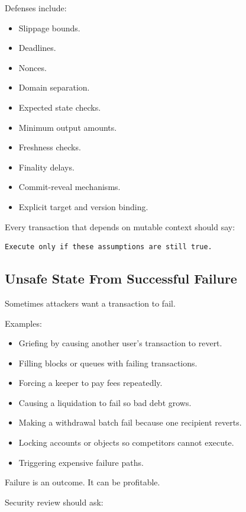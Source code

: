Defenses include:

\begin{itemize}
\tightlist
\item
  Slippage bounds.
\item
  Deadlines.
\item
  Nonces.
\item
  Domain separation.
\item
  Expected state checks.
\item
  Minimum output amounts.
\item
  Freshness checks.
\item
  Finality delays.
\item
  Commit-reveal mechanisms.
\item
  Explicit target and version binding.
\end{itemize}

Every transaction that depends on mutable context should say:

\begin{lstlisting}
Execute only if these assumptions are still true.
\end{lstlisting}

\subsection{Unsafe State From Successful Failure}

Sometimes attackers want a transaction to fail.

Examples:

\begin{itemize}
\tightlist
\item
  Griefing by causing another user's transaction to revert.
\item
  Filling blocks or queues with failing transactions.
\item
  Forcing a keeper to pay fees repeatedly.
\item
  Causing a liquidation to fail so bad debt grows.
\item
  Making a withdrawal batch fail because one recipient reverts.
\item
  Locking accounts or objects so competitors cannot execute.
\item
  Triggering expensive failure paths.
\end{itemize}

Failure is an outcome. It can be profitable.

Security review should ask:

